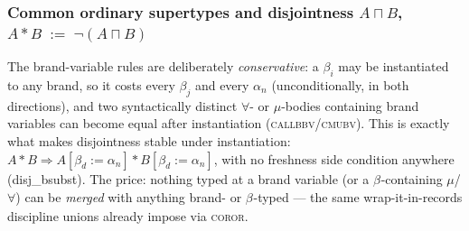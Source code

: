 \documentclass[10pt]{article}
\newcommand{\Int}{\mathsf{Int}}
\newcommand{\bra}[1]{\alpha_{#1}}
\newcommand{\subs}[3]{#1[#2{:=}#3]}
\newcommand{\bv}[1]{\beta_{#1}}
\newcommand{\allb}[1]{\forall.\,#1}
\newcommand{\hbv}[1]{\mathsf{bv}(#1)}
\begin{document}
\subsubsection*{Common ordinary supertypes and disjointness \quad $A \sqcap B$, \; $A * B \;:=\; \neg (A \sqcap B)$}
The brand-variable rules are deliberately \emph{conservative}: a $\bv{i}$ may be
instantiated to any brand, so it costs every $\bv{j}$ and every $\bra{n}$
(unconditionally, in both directions), and two syntactically distinct $\forall$- or
$\mu$-bodies containing brand variables can become equal after instantiation
(\textsc{callbbv}/\textsc{cmubv}).  This is exactly what makes disjointness stable
under instantiation: $A * B \Rightarrow \subs{A}{\bv{d}}{\bra{n}} *
\subs{B}{\bv{d}}{\bra{n}}$, with no freshness side condition anywhere
(\textsf{disj\_bsubst}).  The price: nothing typed at a brand variable (or a
$\bv{}$-containing $\mu$/$\forall$) can be \emph{merged} with anything brand- or
$\bv{}$-typed — the same wrap-it-in-records discipline unions already impose via
\textsc{coror}.
\end{document}
